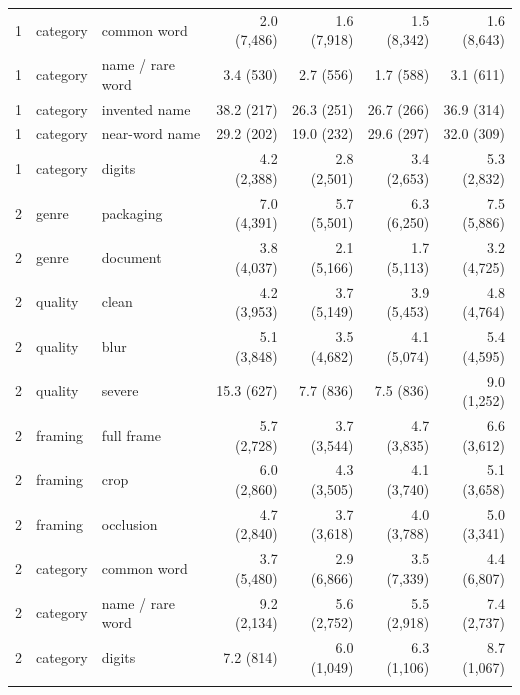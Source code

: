 \documentclass[pdflatex,sn-mathphys-num]{sn-jnl}%
\theoremstyle{thmstyleone}%
\theoremstyle{thmstyletwo}%
\theoremstyle{thmstylethree}%
\begin{document}
\begin{appendices}
\begin{table}[!tbp]
\begin{tabular*}{\textwidth}{@{\extracolsep\fill}lllrrrr}
1 & category & common word & 2.0 (7{,}486) & 1.6 (7{,}918) & 1.5 (8{,}342) & 1.6 (8{,}643) \\
1 & category & name / rare word & 3.4 (530) & 2.7 (556) & 1.7 (588) & 3.1 (611) \\
1 & category & invented name & 38.2 (217) & 26.3 (251) & 26.7 (266) & 36.9 (314) \\
1 & category & near-word name & 29.2 (202) & 19.0 (232) & 29.6 (297) & 32.0 (309) \\
1 & category & digits & 4.2 (2{,}388) & 2.8 (2{,}501) & 3.4 (2{,}653) & 5.3 (2{,}832) \\
\midrule
2 & genre & packaging & 7.0 (4{,}391) & 5.7 (5{,}501) & 6.3 (6{,}250) & 7.5 (5{,}886) \\
2 & genre & document & 3.8 (4{,}037) & 2.1 (5{,}166) & 1.7 (5{,}113) & 3.2 (4{,}725) \\
2 & quality & clean & 4.2 (3{,}953) & 3.7 (5{,}149) & 3.9 (5{,}453) & 4.8 (4{,}764) \\
2 & quality & blur & 5.1 (3{,}848) & 3.5 (4{,}682) & 4.1 (5{,}074) & 5.4 (4{,}595) \\
2 & quality & severe & 15.3 (627) & 7.7 (836) & 7.5 (836) & 9.0 (1{,}252) \\
2 & framing & full frame & 5.7 (2{,}728) & 3.7 (3{,}544) & 4.7 (3{,}835) & 6.6 (3{,}612) \\
2 & framing & crop & 6.0 (2{,}860) & 4.3 (3{,}505) & 4.1 (3{,}740) & 5.1 (3{,}658) \\
2 & framing & occlusion & 4.7 (2{,}840) & 3.7 (3{,}618) & 4.0 (3{,}788) & 5.0 (3{,}341) \\
2 & category & common word & 3.7 (5{,}480) & 2.9 (6{,}866) & 3.5 (7{,}339) & 4.4 (6{,}807) \\
2 & category & name / rare word & 9.2 (2{,}134) & 5.6 (2{,}752) & 5.5 (2{,}918) & 7.4 (2{,}737) \\
2 & category & digits & 7.2 (814) & 6.0 (1{,}049) & 6.3 (1{,}106) & 8.7 (1{,}067) \\
\botrule
\end{tabular*}
\end{table}

\FloatBarrier
\end{appendices}


\end{document}
